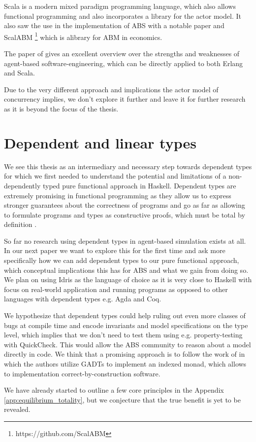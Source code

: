 Scala is a modern mixed paradigm programming language, which also allows functional programming and also incorporates a library for the actor model. It also saw the use in the implementation of ABS with a notable paper \cite{krzywicki_massively_2015} and ScalABM \footnote{https://github.com/ScalABM} which is alibrary for ABM in economics.

The paper of \cite{jennings_agent-based_2000} gives an excellent overview over the strengths and weaknesses of agent-based software-engineering, which can be directly applied to both Erlang and Scala.

Due to the very different approach and implications the actor model of concurrency implies, we don't explore it further and leave it for further research as it is beyond the focus of the thesis.

\section{Dependent and linear types}
We see this thesis as an intermediary and necessary step towards dependent types for which we first needed to understand the potential and limitations of a non-dependently typed pure functional approach in Haskell. Dependent types are extremely promising in functional programming as they allow us to express stronger guarantees about the correctness of programs and go as far as allowing to formulate programs and types as constructive proofs, which must be total by definition \cite{thompson_type_1991, altenkirch_why_2005, altenkirch_pi_2010}.

So far no research using dependent types in agent-based simulation exists at all. In our next paper we want to explore this for the first time and ask more specifically how we can add dependent types to our pure functional approach, which conceptual implications this has for ABS and what we gain from doing so. We plan on using Idris \cite{brady_idris_2013} as the language of choice as it is very close to Haskell with focus on real-world application and running programs as opposed to other languages with dependent types e.g. Agda and Coq.

We hypothesize that dependent types could help ruling out even more classes of bugs at compile time and encode invariants and model specifications on the type level, which implies that we don't need to test them using e.g. property-testing with QuickCheck. This would allow the ABS community to reason about a model directly in code. We think that a promising approach is to follow the work of \cite{brady_programming_2013, fowler_dependent_2014, brady_state_2016} in which the authors utilize GADTs to implement an indexed monad, which allows to implementation correct-by-construction software.

We have already started to outline a few core principles in the Appendix \ref{app:equilibrium_totality}, but we conjecture that the true benefit is yet to be revealed.
